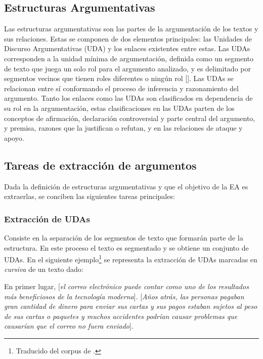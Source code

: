\subsection{Estructuras Argumentativas}

Las estructuras argumentativas son las partes de la argumentación de los textos y sus relaciones.
Estas se componen de dos elementos principales: las Unidades de Discurso Argumentativas (UDA) y los enlaces
existentes entre estas. Las UDAs corresponden a la unidad mínima de argumentación, definida 
como un segmento de texto que juega un solo rol para el argumento analizado, y es 
delimitado por segmentos vecinos que tienen roles diferentes o ningún rol [\cite{stede2018argumentation}].
Las UDAs se relacionan entre sí conformando el proceso de inferencia y razonamiento del argumento.
Tanto los enlaces como las UDAs son clasificados en dependencia de su rol en la argumentación, estas clasificaciones 
en las UDAs parten de los conceptos de afirmación, declaración controversial y parte central del argumento, y premisa,
razones que la justifican o refutan, y en las relaciones de ataque y apoyo. 

\subsection{Tareas de extracción de argumentos}

Dada la definición de estructuras argumentativas y que el objetivo de la EA es extraerlas,
se conciben las siguientes tareas principales:

\subsubsection{Extracción de UDAs}

Consiste en la separación de los segmentos de texto que formarán parte de la estructura.
En este proceso el texto es segmentado y se obtiene un conjunto de UDAs. En el siguiente 
ejemplo\footnote{Traducido del corpus de 
\textcite{stab2017parsing}
.} se representa 
la extracción de UDAs marcadas en \emph{cursiva} de un texto dado:

\begin{adjustwidth}{25pt}{25pt}
    En primer lugar, [\emph{el correo electrónico puede contar como uno de los resultados
    más beneficiosos de la tecnología moderna}]. [\emph{Años atrás, las personas pagaban gran cantidad de dinero para 
    enviar sus cartas y sus pagos estaban sujetos al peso de sus cartas o paquetes y muchos accidentes podrían 
    causar problemas que causarían que el correo no fuera enviado}].
\end{adjustwidth}

